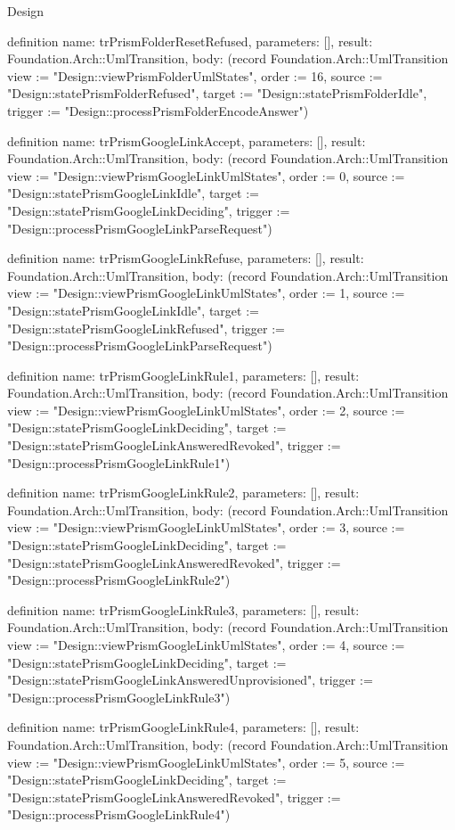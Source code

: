 \begin{lexlean}{Design}
\begin{semanticmodule}
definition{
  name: trPrismFolderResetRefused,
  parameters: [],
  result: Foundation.Arch::UmlTransition,
  body: (record Foundation.Arch::UmlTransition {view := "Design::viewPrismFolderUmlStates", order := 16, source := "Design::statePrismFolderRefused", target := "Design::statePrismFolderIdle", trigger := "Design::processPrismFolderEncodeAnswer"})
}

definition{
  name: trPrismGoogleLinkAccept,
  parameters: [],
  result: Foundation.Arch::UmlTransition,
  body: (record Foundation.Arch::UmlTransition {view := "Design::viewPrismGoogleLinkUmlStates", order := 0, source := "Design::statePrismGoogleLinkIdle", target := "Design::statePrismGoogleLinkDeciding", trigger := "Design::processPrismGoogleLinkParseRequest"})
}

definition{
  name: trPrismGoogleLinkRefuse,
  parameters: [],
  result: Foundation.Arch::UmlTransition,
  body: (record Foundation.Arch::UmlTransition {view := "Design::viewPrismGoogleLinkUmlStates", order := 1, source := "Design::statePrismGoogleLinkIdle", target := "Design::statePrismGoogleLinkRefused", trigger := "Design::processPrismGoogleLinkParseRequest"})
}

definition{
  name: trPrismGoogleLinkRule1,
  parameters: [],
  result: Foundation.Arch::UmlTransition,
  body: (record Foundation.Arch::UmlTransition {view := "Design::viewPrismGoogleLinkUmlStates", order := 2, source := "Design::statePrismGoogleLinkDeciding", target := "Design::statePrismGoogleLinkAnsweredRevoked", trigger := "Design::processPrismGoogleLinkRule1"})
}

definition{
  name: trPrismGoogleLinkRule2,
  parameters: [],
  result: Foundation.Arch::UmlTransition,
  body: (record Foundation.Arch::UmlTransition {view := "Design::viewPrismGoogleLinkUmlStates", order := 3, source := "Design::statePrismGoogleLinkDeciding", target := "Design::statePrismGoogleLinkAnsweredRevoked", trigger := "Design::processPrismGoogleLinkRule2"})
}

definition{
  name: trPrismGoogleLinkRule3,
  parameters: [],
  result: Foundation.Arch::UmlTransition,
  body: (record Foundation.Arch::UmlTransition {view := "Design::viewPrismGoogleLinkUmlStates", order := 4, source := "Design::statePrismGoogleLinkDeciding", target := "Design::statePrismGoogleLinkAnsweredUnprovisioned", trigger := "Design::processPrismGoogleLinkRule3"})
}

definition{
  name: trPrismGoogleLinkRule4,
  parameters: [],
  result: Foundation.Arch::UmlTransition,
  body: (record Foundation.Arch::UmlTransition {view := "Design::viewPrismGoogleLinkUmlStates", order := 5, source := "Design::statePrismGoogleLinkDeciding", target := "Design::statePrismGoogleLinkAnsweredRevoked", trigger := "Design::processPrismGoogleLinkRule4"})
}


\end{semanticmodule}
\end{lexlean}

